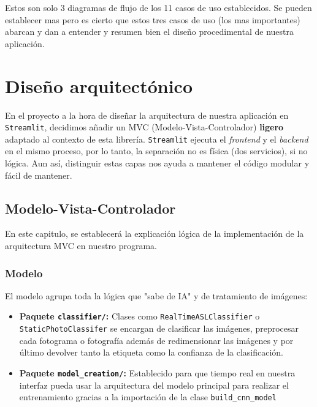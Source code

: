 

Estos son solo 3 diagramas de flujo de los 11 casos de uso establecidos. Se pueden establecer mas pero es cierto que estos tres casos de uso (los mas importantes) abarcan y dan a entender y resumen bien el diseño procedimental de nuestra aplicación.

\section{Diseño arquitectónico}
En el proyecto a la hora de diseñar la arquitectura de nuestra aplicación en \texttt{Streamlit}, decidimos añadir un MVC (Modelo-Vista-Controlador) \textbf{ligero} adaptado al contexto de esta librería. \texttt{Streamlit} ejecuta el \textit{frontend} y el \textit{backend} en el mismo proceso, por lo tanto, la separación no es física (dos servicios), si no lógica. Aun así, distinguir estas capas nos ayuda a mantener el código modular y fácil de mantener. 

\subsection{Modelo-Vista-Controlador}


En este capitulo, se establecerá la explicación lógica de la implementación de la arquitectura MVC en nuestro programa.

\subsubsection{Modelo}
El modelo agrupa toda la lógica que "sabe de IA" y de tratamiento de imágenes:
\begin{itemize}
    \item \textbf{Paquete \texttt{classifier/}:} Clases como \texttt{RealTimeASLClassifier} o \texttt{StaticPhotoClassifer} se encargan de clasificar las imágenes, preprocesar cada fotograma o fotografía además de redimensionar las imágenes y por último devolver tanto la etiqueta como la confianza de la clasificación.

    \item \textbf{Paquete \texttt{model\_creation/}:} Establecido para que tiempo real en nuestra interfaz pueda usar la arquitectura del modelo principal para realizar el entrenamiento gracias a la importación de la clase \texttt{build\_cnn\_model}
\end{itemize}



